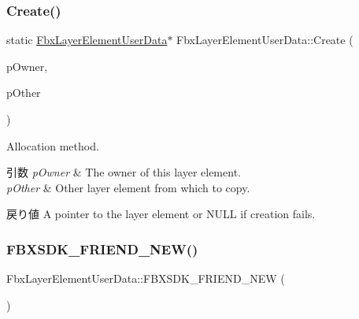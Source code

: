 \subsubsection{\texorpdfstring{Create()}{Create()}\hspace{0.1cm}{\footnotesize\ttfamily [2/2]}}
{\footnotesize\ttfamily static \hyperlink{class_fbx_layer_element_user_data}{Fbx\+Layer\+Element\+User\+Data}$\ast$ Fbx\+Layer\+Element\+User\+Data\+::\+Create (\begin{DoxyParamCaption}\item[{\hyperlink{class_fbx_layer_container}{Fbx\+Layer\+Container} $\ast$}]{p\+Owner,  }\item[{\hyperlink{class_fbx_layer_element_user_data}{Fbx\+Layer\+Element\+User\+Data} const \&}]{p\+Other }\end{DoxyParamCaption})\hspace{0.3cm}{\ttfamily [static]}}

Allocation method. 
\begin{DoxyParams}{引数}
{\em p\+Owner} & The owner of this layer element. \\
\hline
{\em p\+Other} & Other layer element from which to copy. \\
\hline
\end{DoxyParams}
\begin{DoxyReturn}{戻り値}
A pointer to the layer element or {\ttfamily N\+U\+LL} if creation fails. 
\end{DoxyReturn}
\mbox{\label{class_fbx_layer_element_user_data_a74d02ad7467ab2f2af089d3fad83f617}} 
\subsubsection{\texorpdfstring{F\+B\+X\+S\+D\+K\+\_\+\+F\+R\+I\+E\+N\+D\+\_\+\+N\+E\+W()}{FBXSDK\_FRIEND\_NEW()}}
{\footnotesize\ttfamily Fbx\+Layer\+Element\+User\+Data\+::\+F\+B\+X\+S\+D\+K\+\_\+\+F\+R\+I\+E\+N\+D\+\_\+\+N\+EW (\begin{DoxyParamCaption}{ }\end{DoxyParamCaption})}

